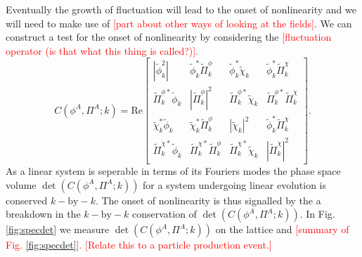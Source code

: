Eventually the growth of fluctuation will lead to the onset of nonlinearity and we will need to make use of \textcolor{red}{[part about other ways of looking at the fields]}. We can construct a test for the onset of nonlinearity by considering the \textcolor{red}{[fluctuation operator (is that what this thing is called?)].}
\begin{equation}
  C(\phi^A,\Pi^A;k) =
  \mathrm{Re}\left[
    \begin{matrix}
      |\tilde{\phi}_k^2| & \tilde{\phi}_k^*\tilde{\Pi}^\phi_k & \tilde{\phi}_k^*\tilde{\chi}_k & \tilde{\phi}_k^*\tilde{\Pi}^\chi_k \\
      \tilde{\Pi}^{\phi *}_k\tilde{\phi}_k & |\tilde{\Pi}^\phi_k|^2 & \tilde{\Pi}^{\phi *}_k\tilde{\chi}_k & \tilde{\Pi}^{\phi *}_k\tilde{\Pi}^\chi_k \\
      \tilde{\chi}_k^*\tilde{\phi}_k & \tilde{\chi}_k^*\tilde{\Pi}^\phi_k & |\tilde{\chi}_k|^2 & \tilde{\phi}_k^*\tilde{\Pi}^\chi_k \\
      \tilde{\Pi}^{\chi *}_k\tilde{\phi}_k & \tilde{\Pi}^{\chi *}_k\tilde{\Pi}^\phi_k & \tilde{\Pi}^{\chi *}_k\tilde{\chi}_k & |\tilde{\Pi}^\chi_k|^2
    \end{matrix}
  \right].
\end{equation}
As a linear system is seperable in terms of its Fouriers modes the phase space volume $\det(C(\phi^A,\Pi^A;k))$ for a system undergoing linear evolution is conserved $k-\text{by}-k$. The onset of nonlinearity is thus signalled by the a breakdown in the $k-\text{by}-k$ conservation of $\det(C(\phi^A,\Pi^A;k))$. In Fig. \ref{fig:specdet} we measure $\det(C(\phi^A,\Pi^A;k))$ on the lattice and \textcolor{red}{[summary of Fig. \ref{fig:specdet}].}
\textcolor{red}{[Relate this to a particle production event.]}



\Fslice


